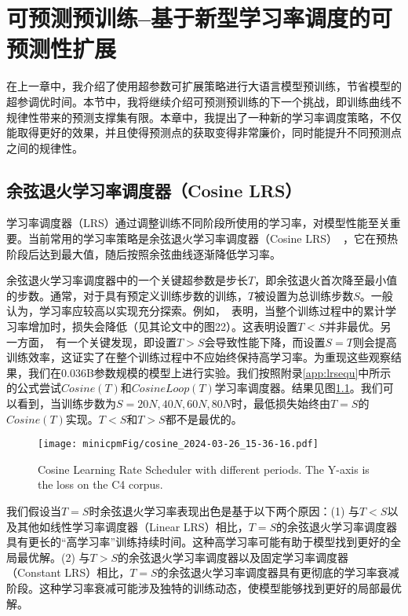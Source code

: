 
\chapter{可预测预训练--基于新型学习率调度的可预测性扩展}

在上一章中，我介绍了使用超参数可扩展策略进行大语言模型预训练，节省模型的超参调优时间。本节中，我将继续介绍可预测预训练的下一个挑战，即训练曲线不规律性带来的预测支撑集有限。本章中，我提出了一种新的学习率调度策略，不仅能取得更好的效果，并且使得预测点的获取变得非常廉价，同时能提升不同预测点之间的规律性。


\section{余弦退火学习率调度器（Cosine LRS）}
学习率调度器（LRS）通过调整训练不同阶段所使用的学习率，对模型性能至关重要。当前常用的学习率策略是余弦退火学习率调度器（Cosine LRS）~\citep{kaplan2020scaling, hoffmann2022training, rae2021scaling, touvron2023llama, bai2023qwen, almazrouei2023falcon}，它在预热阶段后达到最大值，随后按照余弦曲线逐渐降低学习率。

余弦退火学习率调度器中的一个关键超参数是步长$T$，即余弦退火首次降至最小值的步数。通常，对于具有预定义训练步数的训练，$T$被设置为总训练步数$S$。一般认为，学习率应较高以实现充分探索。例如，~\cite{kaplan2020scaling}表明，当整个训练过程中的累计学习率增加时，损失会降低（见其论文中的图22）。这表明设置$T < S$并非最优。另一方面，~\cite{hoffmann2022training}有一个关键发现，即设置$T > S$会导致性能下降，而设置$S = T$则会提高训练效率，这证实了在整个训练过程中不应始终保持高学习率。为重现这些观察结果，我们在0.036B参数规模的模型上进行实验。我们按照附录\ref{app:lrsequ}中所示的公式尝试$Cosine(T)$和$CosineLoop(T)$学习率调度器。结果见图\ref{fig:cosine_lr}。我们可以看到，当训练步数为$S = 20N, 40N, 60N, 80N$时，最低损失始终由$T = S$的$Cosine(T)$实现。$T < S$和$T > S$都不是最优的。

\begin{figure}
    \centering
    \texttt{[image: minicpmFig/cosine\_2024-03-26\_15-36-16.pdf]}
    \caption{Cosine Learning Rate Scheduler with different periods. The Y-axis is the loss on the C4 corpus.}
    \label{fig:cosine_lr}
    \vspace{0.47cm}
\end{figure}

我们假设当$T = S$时余弦退火学习率表现出色是基于以下两个原因：(1) 与$T < S$以及其他如线性学习率调度器（Linear LRS）相比，$T = S$的余弦退火学习率调度器具有更长的“高学习率”训练持续时间。这种高学习率可能有助于模型找到更好的全局最优解。(2) 与$T > S$的余弦退火学习率调度器以及固定学习率调度器（Constant LRS）相比，$T = S$的余弦退火学习率调度器具有更彻底的学习率衰减阶段。这种学习率衰减可能涉及独特的训练动态，使模型能够找到更好的局部最优解。


